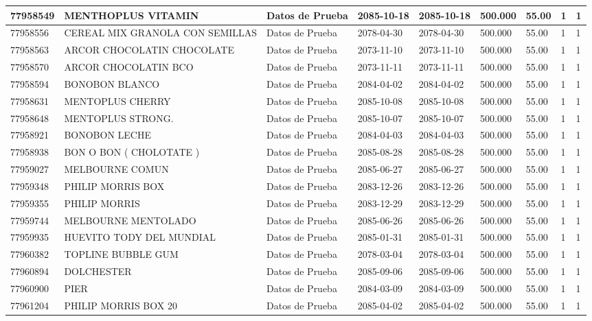 \documentclass[a4paper,12pt]{article}
\begin{document}
\begin{landscape}
\begin{longtable}{|p{4cm}|p{2.5cm}|p{2.5cm}|p{1.8cm}|p{1.8cm}|p{1cm}|p{1cm}|p{3cm}|p{3cm}||}
77958549 & MENTHOPLUS  VITAMIN & Datos de Prueba & 2085-10-18 & 2085-10-18 & 500.000 & 55.00 & 1 & 1 \\ \hline 
77958556 & CEREAL MIX GRANOLA CON SEMILLAS & Datos de Prueba & 2078-04-30 & 2078-04-30 & 500.000 & 55.00 & 1 & 1 \\ \hline 
77958563 & ARCOR CHOCOLATIN CHOCOLATE & Datos de Prueba & 2073-11-10 & 2073-11-10 & 500.000 & 55.00 & 1 & 1 \\ \hline 
77958570 & ARCOR CHOCOLATIN BCO & Datos de Prueba & 2073-11-11 & 2073-11-11 & 500.000 & 55.00 & 1 & 1 \\ \hline 
77958594 & BONOBON BLANCO & Datos de Prueba & 2084-04-02 & 2084-04-02 & 500.000 & 55.00 & 1 & 1 \\ \hline 
77958631 & MENTOPLUS  CHERRY & Datos de Prueba & 2085-10-08 & 2085-10-08 & 500.000 & 55.00 & 1 & 1 \\ \hline 
77958648 & MENTOPLUS   STRONG. & Datos de Prueba & 2085-10-07 & 2085-10-07 & 500.000 & 55.00 & 1 & 1 \\ \hline 
77958921 & BONOBON  LECHE & Datos de Prueba & 2084-04-03 & 2084-04-03 & 500.000 & 55.00 & 1 & 1 \\ \hline 
77958938 & BON O BON ( CHOLOTATE ) & Datos de Prueba & 2085-08-28 & 2085-08-28 & 500.000 & 55.00 & 1 & 1 \\ \hline 
77959027 & MELBOURNE  COMUN & Datos de Prueba & 2085-06-27 & 2085-06-27 & 500.000 & 55.00 & 1 & 1 \\ \hline 
77959348 & PHILIP MORRIS BOX & Datos de Prueba & 2083-12-26 & 2083-12-26 & 500.000 & 55.00 & 1 & 1 \\ \hline 
77959355 & PHILIP MORRIS & Datos de Prueba & 2083-12-29 & 2083-12-29 & 500.000 & 55.00 & 1 & 1 \\ \hline 
77959744 & MELBOURNE  MENTOLADO & Datos de Prueba & 2085-06-26 & 2085-06-26 & 500.000 & 55.00 & 1 & 1 \\ \hline 
77959935 & HUEVITO  TODY   DEL  MUNDIAL & Datos de Prueba & 2085-01-31 & 2085-01-31 & 500.000 & 55.00 & 1 & 1 \\ \hline 
77960382 & TOPLINE BUBBLE GUM & Datos de Prueba & 2078-03-04 & 2078-03-04 & 500.000 & 55.00 & 1 & 1 \\ \hline 
77960894 & DOLCHESTER & Datos de Prueba & 2085-09-06 & 2085-09-06 & 500.000 & 55.00 & 1 & 1 \\ \hline 
77960900 & PIER & Datos de Prueba & 2084-03-09 & 2084-03-09 & 500.000 & 55.00 & 1 & 1 \\ \hline 
77961204 & PHILIP  MORRIS  BOX  20 & Datos de Prueba & 2085-04-02 & 2085-04-02 & 500.000 & 55.00 & 1 & 1 \\ \hline 

\end{longtable}
\end{landscape}
\end{document}
